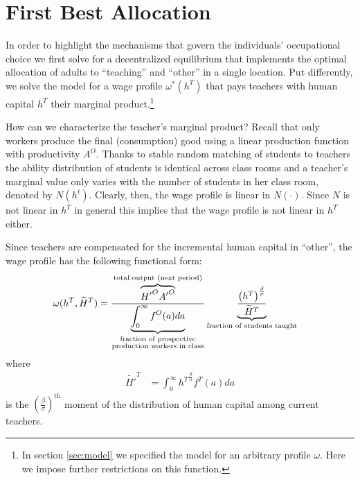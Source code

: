 \documentclass[onehalfspacing,11pt]{article}
\begin{document}
\section{First Best Allocation}\label{sec:firstbest}
In order to highlight the mechanisms that govern the individuals' occupational choice we first solve for a decentralized equilibrium that implements the optimal allocation of adults to ``teaching'' and ``other'' in a single location. Put differently, we solve the model for a wage profile $\omega^*(h^T)$ that pays teachers with human capital $h^T$ their marginal product.\footnote{In section \ref{sec:model} we specified the model for an arbitrary profile $\omega$. Here we impose further restrictions on this function.}

How can we characterize the teacher's marginal product? Recall that only workers produce the final (consumption) good using a linear production function with productivity $A^O$. Thanks to stable random matching of students to teachers the ability distribution of students is identical across class rooms and a teacher's marginal value only varies with the number of students in her class room, denoted by $N(h^t)$. Clearly, then, the wage profile is linear in $N(\cdot)$. Since $N$ is not linear in $h^T$ in general this implies that the wage profile is not linear in $h^T$ either.

Since teachers are compensated for the incremental human capital in ``other'', the wage profile has the following functional form:
\begin{align}
\label{eq:omegaOpt}
   \omega(h^T,\widetilde{H}^T) & =  \frac{\overbrace{{H'}^O {A'}^O}^{\textrm{total output (next period)}}}{\underbrace{\int_0^\infty f^O(a) da}_{\begin{subarray}{c}\textrm{fraction of prospective} \\ \textrm{production workers in class}\end{subarray}}} \underbrace{\frac{\left( h^T \right)^{\frac{\beta}{\sigma}}}{{\widetilde{H}^T}}}_{\textrm{fraction of students taught}}
\end{align}
where
\begin{align*}
\label{}
  \widetilde{H'}^{T} & = \int_0^\infty {h^T}^{\frac{\beta}{\sigma}} f^T(a) da
\end{align*}
is the ${\left( \tfrac{\beta}{\sigma} \right)}^{\textrm{th}}$ moment of the distribution of human capital among current teachers.
\end{document}
